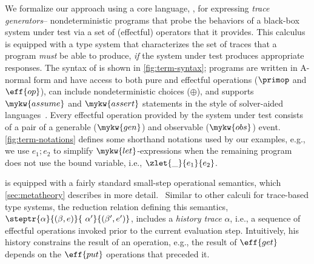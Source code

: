 We formalize our approach using a core language, \DSL{}, for
expressing \textit{trace generators}-- nondeterministic programs that
probe the behaviors of a black-box system under test via a set of
(effectful) operators that it provides. This calculus is equipped with
a type system that characterizes the set of traces that a program
\emph{must} be able to produce, \emph{if} the system under test
produces appropriate responses. The syntax of \DSL{} is shown in
\autoref{fig:term-syntax}; programs are written in A-normal form and
have access to both pure and effectful operations ($\primop$ and
$\eff{op}$), can include nondeterministic choices ($\oplus$), and
supports $\mykw{assume}$ and $\mykw{assert}$ statements in the style
of solver-aided languages~\cite{Rosette}. Every effectful operation provided by
the system under test consists of a pair of a generable ($\mykw{gen}$)
and observable ($\mykw{obs}$) event.  \autoref{fig:term-notations} defines some
shorthand notations used by our examples, e.g., we use $e_1;e_2$ to
simplify $\mykw{let}$-expressions when the remaining program does not
use the bound variable, i.e., $\zlet{\_}{e_1}{e_2}$.

\DSL{} is equipped with a fairly standard small-step operational
semantics, which \autoref{sec:metatheory} describes in more
detail.  \ Similar to other calculi for trace-based type
systems, the reduction relation defining this semantics,
$\steptr{\alpha}{(\beta, e)}{~\alpha'}{(\beta', e')}$, includes a
\textit{history trace} $\alpha$, i.e., a sequence of effectful
operations invoked prior to the current evaluation step. Intuitively,
his history constrains the result of an operation, e.g., the result of
$\eff{get}$ depends on the $\eff{put}$ operations that preceded it.



